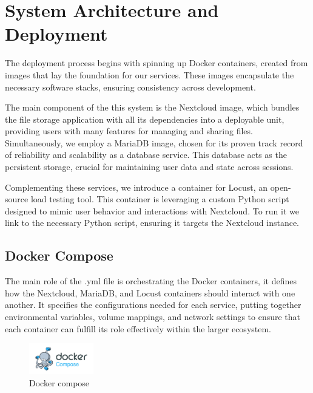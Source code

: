 \documentclass[12pt]{article}
\begin{document}
\section{System Architecture and Deployment}
\label{sec:deployment}
The deployment process begins with spinning up Docker containers, created from images that lay the foundation for our services. These images encapsulate the necessary software stacks, ensuring consistency across development.

The main component of the this system is the Nextcloud image, which bundles the file storage application with all its dependencies into a deployable unit, providing users with many features for managing and sharing files. Simultaneously, we employ a MariaDB image, chosen for its proven track record of reliability and scalability as a database service. This database acts as the persistent storage, crucial for maintaining user data and state across sessions.

Complementing these services, we introduce a container for Locust, an open-source load testing tool. This container is leveraging a custom Python script designed to mimic user behavior and interactions with Nextcloud. To run it we link to the necessary Python script, ensuring it targets the Nextcloud instance.

\subsection{Docker Compose}

The main role of the .yml file is orchestrating the Docker containers, it defines how the Nextcloud, MariaDB, and Locust containers should interact with one another. It specifies the configurations needed for each service, putting together environmental variables, volume mappings, and network settings to ensure that each container can fulfill its role effectively within the larger ecosystem.

\begin{figure}
  \centering
  \includegraphics[width=0.25\textwidth]{Docker-Compose-Logo.jpg}
  \caption{Docker compose}
  \label{fig:yourlabel}
\end{figure}
\end{document}
